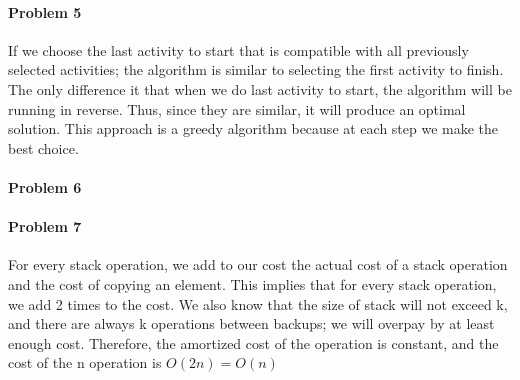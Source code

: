 \documentclass[11pt]{article}
\begin{document}
\paragraph{\noindent\textbf{\LARGE{Problem 5}}}

\begin{flushleft}
If we choose the last activity to start  that is compatible with all previously selected activities; the algorithm is similar to selecting the first activity to finish.
The only difference it that when we do last activity to start, the algorithm will be running in reverse. Thus, since 
they are similar, it will produce an optimal solution. 
\newline 
\newline
This approach is a greedy algorithm because at each step we make the best choice.
\end{flushleft}    

\paragraph{\noindent\textbf{\LARGE{Problem 6}}}
\begin{flushleft}

\end{flushleft}    
    

\paragraph{\noindent\textbf{\LARGE{Problem 7}}}
\begin{flushleft}
    For every stack operation, we add to our cost the actual cost of a stack operation and the cost of copying an element.
    This implies that for every stack operation, we add 2 times to the cost.
    \newline
    \newline
    We also know that the size of stack will not exceed k, and there are always k operations between backups; 
    we will overpay by at least enough cost. 
    Therefore, the amortized cost of the operation is constant, and the cost of the n operation is $O(2n) = O(n)$
\end{flushleft}

\end{document}
